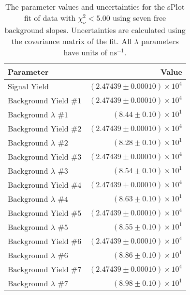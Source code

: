
\begin{table}[ht]
    \begin{center}
        \begin{tabular}{lr}\toprule
            Parameter & Value \\\midrule
            Signal Yield & $(2.47439 \pm 0.00010) \times 10^{4}$ \\
            Background Yield $\#1$ & $(2.47439 \pm 0.00010) \times 10^{4}$ \\
            Background $\lambda$ $\#1$ & $(8.44 \pm 0.10) \times 10^{1}$ \\
            Background Yield $\#2$ & $(2.47439 \pm 0.00010) \times 10^{4}$ \\
            Background $\lambda$ $\#2$ & $(8.28 \pm 0.10) \times 10^{1}$ \\
            Background Yield $\#3$ & $(2.47439 \pm 0.00010) \times 10^{4}$ \\
            Background $\lambda$ $\#3$ & $(8.54 \pm 0.10) \times 10^{1}$ \\
            Background Yield $\#4$ & $(2.47439 \pm 0.00010) \times 10^{4}$ \\
            Background $\lambda$ $\#4$ & $(8.63 \pm 0.10) \times 10^{1}$ \\
            Background Yield $\#5$ & $(2.47439 \pm 0.00010) \times 10^{4}$ \\
            Background $\lambda$ $\#5$ & $(8.55 \pm 0.10) \times 10^{1}$ \\
            Background Yield $\#6$ & $(2.47439 \pm 0.00010) \times 10^{4}$ \\
            Background $\lambda$ $\#6$ & $(8.86 \pm 0.10) \times 10^{1}$ \\
            Background Yield $\#7$ & $(2.47439 \pm 0.00010) \times 10^{4}$ \\
            Background $\lambda$ $\#7$ & $(8.98 \pm 0.10) \times 10^{1}$ \\\bottomrule
        \end{tabular}
        \caption{The parameter values and uncertainties for the sPlot fit of data with $\chi^2_\nu < 5.00$ using seven free background slopes. Uncertainties are calculated using the covariance matrix of the fit. All $\lambda$ parameters have units of $\si{\nano\second}^{-1}$.}\label{tab:splot-fit-results-chisqdof-5.00-free-7}
    \end{center}
\end{table}
